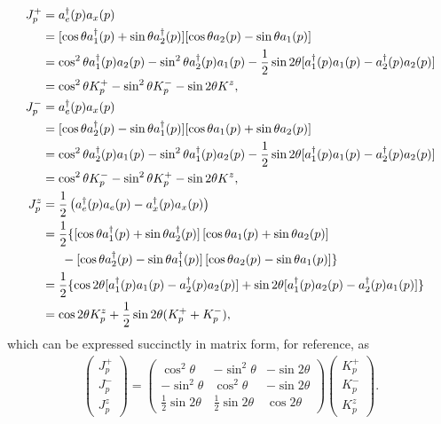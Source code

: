 \documentclass[10pt]{article}
\begin{document}
\begin{align}
J^+_p
&=
a^\dagger_e(p)a_x(p)
\nonumber
\\
&=
[\cos\theta a^\dagger_1(p)+\sin\theta a^\dagger_2(p)]
[\cos\theta a_2(p)-\sin\theta a_1(p)]
\nonumber
\\
&=
\cos^2\theta a^\dagger_1(p)a_2(p)-\sin^2\theta a_2^\dagger(p)a_1(p)-\frac{1}{2}\sin2\theta[a^\dagger_1(p)a_1(p)-a^\dagger_2(p)a_2(p)]
\nonumber
\\
&=
\cos^2\theta K^+_p-\sin^2\theta K^-_p-\sin2\theta K^z,
\\
J^-_p
&=
a^\dagger_e(p)a_x(p)
\nonumber
\\
&=
[\cos\theta a^\dagger_2(p)-\sin\theta a^\dagger_1(p)]
[\cos\theta a_1(p)+\sin\theta a_2(p)]
\nonumber
\\
&=
\cos^2\theta a_2^\dagger(p)a_1(p)
-
\sin^2\theta a^\dagger_1(p)a_2(p)
-
\frac{1}{2}\sin2\theta[a^\dagger_1(p)a_1(p)-a^\dagger_2(p)a_2(p)]
\nonumber
\\
&=
\cos^2\theta K^-_p-\sin^2\theta K^+_p-\sin2\theta K^z,
\\
J^z_p
&=
\frac{1}{2}\left(a^\dagger_e(p)a_e(p)-a^\dagger_x(p)a_x(p)\right)
\nonumber
\\
&=
\frac{1}{2}
\{
[
\cos\theta a^\dagger_1(p)+\sin\theta a^\dagger_2(p)
]
\left[
\cos\theta a_1(p)+\sin\theta a_2(p)
\right]
\nonumber
\\
&\hspace{5.5mm}-
[
\cos\theta a^\dagger_2(p)-\sin\theta a^\dagger_1(p)
]
\left[
\cos\theta a_2(p)-\sin\theta a_1(p)
\right]
\}
\nonumber
\\
&=
\frac{1}{2}
\{
\cos2\theta[a^\dagger_1(p)a_1(p)-a^\dagger_2(p)a_2(p)]
+
\sin2\theta[a^\dagger_1(p)a_2(p)-a^\dagger_2(p)a_1(p)]
\}
\nonumber
\\
&=
\cos2\theta K^z_p+\frac{1}{2}\sin2\theta(K^+_p+K^-_p)
,\end{align}
which can be expressed succinctly in matrix form, for reference, as
\begin{align}
\begin{pmatrix}
J^+_p \\ J^-_p \\ J^z_p
\end{pmatrix}
=
\begin{pmatrix}
\cos^2\theta & -\sin^2\theta & -\sin2\theta \\
-\sin^2\theta & \cos^2\theta & -\sin2\theta \\
\frac{1}{2}\sin2\theta & \frac{1}{2}\sin2\theta & \cos2\theta
\end{pmatrix}
\begin{pmatrix}
K^+_p \\ K^-_p \\ K^z_p
\end{pmatrix}
.\end{align}
\end{document}
